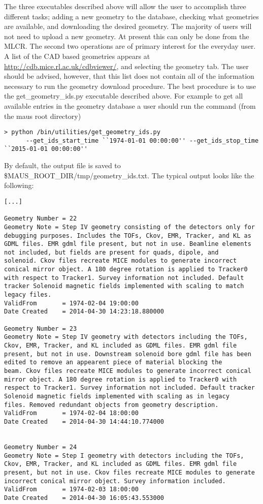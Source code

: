 The three executables described above will allow the user to
accomplish three different tasks; adding a new geometry to the
database, checking what geometries are available, and downloading the
desired geometry. The majority of users will not need to upload a new
geometry. At present this can only be done from the MLCR. The second
two operations are of primary interest for the everyday user. A list
of the CAD based geometries appears at
\url{http://cdb.mice.rl.ac.uk/cdbviewer/}, and selecting the geometry
tab. The user should be advised, however, that this list does not
contain all of the information necessary to run the geometry download
procedure. The best procedure is to use the get\_geometry\_ids.py
executable described above. For example to get all available entries
in the geometry database a user should run the command (from the maus
root directory)
\begin{verbatim}
> python /bin/utilities/get_geometry_ids.py 
      --get_ids_start_time ``1974-01-01 00:00:00'' --get_ids_stop_time ``2015-01-01 00:00:00''
\end{verbatim}
By default, the output file is saved to
\$MAUS\_ROOT\_DIR/tmp/geometry\_ids.txt. The typical output looks like
the following:
\begin{verbatim}
[...]

Geometry Number = 22
Geometry Note = Step IV geometry consisting of the detectors only for
debugging purposes. Includes the TOFs, Ckov, EMR, Tracker, and KL as
GDML files. EMR gdml file present, but not in use. Beamline elements
not included, but fields are present for quads, dipole, and
solenoid. Ckov files recreate MICE modules to generate incorrect
conical mirror object. A 180 degree rotation is applied to Tracker0
with respect to Tracker1. Survey information not included. Default
tracker Solenoid magnetic fields implemented with scaling to match
legacy files.
ValidFrom       = 1974-02-04 19:00:00
Date Created    = 2014-04-30 14:23:18.880000

Geometry Number = 23
Geometry Note = Step IV geometry with detectors including the TOFs,
Ckov, EMR, Tracker, and KL included as GDML files. EMR gdml file
present, but not in use. Downstream solenoid bore gdml file has been
edited to remove an appearent piece of material blocking the
beam. Ckov files recreate MICE modules to generate incorrect conical
mirror object. A 180 degree rotation is applied to Tracker0 with
respect to Tracker1. Survey information not included. Default tracker
Solenoid magnetic fields implemented with scaling as in legacy
files. Removed redundant objects from geometry description.
ValidFrom       = 1974-02-04 18:00:00
Date Created    = 2014-04-30 14:44:10.774000


Geometry Number = 24
Geometry Note = Step I geometry with detectors including the TOFs,
Ckov, EMR, Tracker, and KL included as GDML files. EMR gdml file
present, but not in use. Ckov files recreate MICE modules to generate
incorrect conical mirror object. Survey information included.
ValidFrom       = 1974-02-03 18:00:00
Date Created    = 2014-04-30 16:05:43.553000

\end{verbatim}
